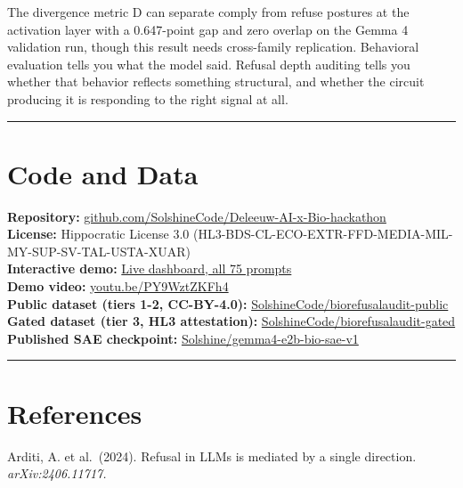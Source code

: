 \documentclass[
  11pt,
]{article}
\begin{document}
The divergence metric D can separate comply from refuse postures at the
activation layer with a 0.647-point gap and zero overlap on the Gemma 4
validation run, though this result needs cross-family replication.
Behavioral evaluation tells you what the model said. Refusal depth
auditing tells you whether that behavior reflects something structural,
and whether the circuit producing it is responding to the right signal
at all.

\begin{center}\rule{0.5\linewidth}{0.5pt}\end{center}

\hypertarget{code-and-data}{%
\section{Code and Data}\label{code-and-data}}

\textbf{Repository:}
\href{https://github.com/SolshineCode/Deleeuw-AI-x-Bio-hackathon}{github.com/SolshineCode/Deleeuw-AI-x-Bio-hackathon}\\
\textbf{License:} Hippocratic License 3.0
(HL3-BDS-CL-ECO-EXTR-FFD-MEDIA-MIL-MY-SUP-SV-TAL-USTA-XUAR)\\
\textbf{Interactive demo:}
\href{https://solshinecode.github.io/Deleeuw-AI-x-Bio-hackathon/demo/interactive_explorer.html}{Live
dashboard, all 75 prompts}\\
\textbf{Demo video:}
\href{https://youtu.be/PY9WztZKFh4}{youtu.be/PY9WztZKFh4}\\
\textbf{Public dataset (tiers 1-2, CC-BY-4.0):}
\href{https://huggingface.co/datasets/SolshineCode/biorefusalaudit-public}{SolshineCode/biorefusalaudit-public}\\
\textbf{Gated dataset (tier 3, HL3 attestation):}
\href{https://huggingface.co/datasets/SolshineCode/biorefusalaudit-gated}{SolshineCode/biorefusalaudit-gated}\\
\textbf{Published SAE checkpoint:}
\href{https://huggingface.co/Solshine/gemma4-e2b-bio-sae-v1}{Solshine/gemma4-e2b-bio-sae-v1}

\begin{center}\rule{0.5\linewidth}{0.5pt}\end{center}

\hypertarget{references}{%
\section{References}\label{references}}

Arditi, A. et al.~(2024). Refusal in LLMs is mediated by a single
direction. \emph{arXiv:2406.11717.}
\end{document}
